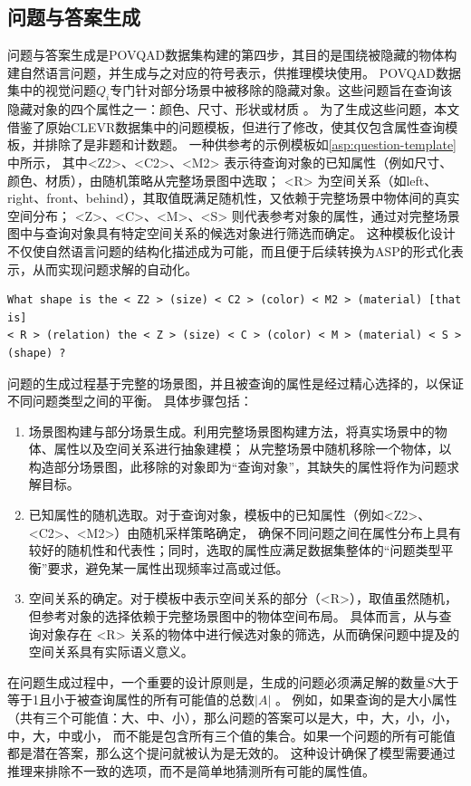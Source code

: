\subsection{问题与答案生成}
问题与答案生成是POVQAD数据集构建的第四步，其目的是围绕被隐藏的物体构建自然语言问题，并生成与之对应的符号表示，供推理模块使用。
POVQAD数据集中的视觉问题$Q_i$专门针对部分场景中被移除的隐藏对象。这些问题旨在查询该隐藏对象的四个属性之一：颜色、尺寸、形状或材质 。
为了生成这些问题，本文借鉴了原始CLEVR数据集中的问题模板，但进行了修改，使其仅包含属性查询模板，并排除了是非题和计数题。
一种供参考的示例模板如\ref{asp:question-template}中所示，
其中<Z2>、<C2>、<M2> 表示待查询对象的已知属性（例如尺寸、颜色、材质），由随机策略从完整场景图中选取；
<R> 为空间关系（如left、right、front、behind），其取值既满足随机性，又依赖于完整场景中物体间的真实空间分布；
<Z>、<C>、<M>、<S> 则代表参考对象的属性，通过对完整场景图中与查询对象具有特定空间关系的候选对象进行筛选而确定。
这种模板化设计不仅使自然语言问题的结构化描述成为可能，而且便于后续转换为ASP的形式化表示，从而实现问题求解的自动化。

\begin{lstlisting}[label=asp:question-template]
What shape is the < Z2 > (size) < C2 > (color) < M2 > (material) [that is] 
< R > (relation) the < Z > (size) < C > (color) < M > (material) < S > (shape) ?
\end{lstlisting}

问题的生成过程基于完整的场景图，并且被查询的属性是经过精心选择的，以保证不同问题类型之间的平衡。
具体步骤包括：
\begin{enumerate}[itemsep=0pt,parsep=0pt]
\item 场景图构建与部分场景生成。利用完整场景图构建方法，将真实场景中的物体、属性以及空间关系进行抽象建模；
从完整场景中随机移除一个物体，以构造部分场景图，此移除的对象即为“查询对象”，其缺失的属性将作为问题求解目标。
\item 已知属性的随机选取。对于查询对象，模板中的已知属性（例如<Z2>、<C2>、<M2>）由随机采样策略确定，
确保不同问题之间在属性分布上具有较好的随机性和代表性；同时，选取的属性应满足数据集整体的“问题类型平衡”要求，避免某一属性出现频率过高或过低。
\item 空间关系的确定。对于模板中表示空间关系的部分（<R>），取值虽然随机，但参考对象的选择依赖于完整场景图中的物体空间布局。
具体而言，从与查询对象存在 <R> 关系的物体中进行候选对象的筛选，从而确保问题中提及的空间关系具有实际语义意义。
\end{enumerate}

在问题生成过程中，一个重要的设计原则是，生成的问题必须满足解的数量$S$大于等于1且小于被查询属性的所有可能值的总数$|A|$ 。
例如，如果查询的是大小属性（共有三个可能值：大、中、小），那么问题的答案可以是{大，中}，{大，小}，{小，中}，{大}，{中}或{小}，
而不能是包含所有三个值的集合。如果一个问题的所有可能值都是潜在答案，那么这个提问就被认为是无效的。
这种设计确保了模型需要通过推理来排除不一致的选项，而不是简单地猜测所有可能的属性值。

